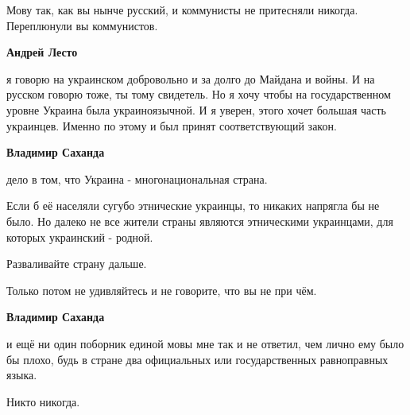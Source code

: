 \begin{itemize}
\begin{itemize}
Мову так, как вы нынче русский, и коммунисты не притесняли никогда. Переплюнули
вы коммунистов.

 
\textbf{Андрей Лесто} 

я говорю на украинском добровольно и за долго до Майдана и войны. И на русском
говорю тоже, ты тому свидетель. Но я хочу чтобы на государственном уровне
Украина была украиноязычной. И я уверен, этого хочет большая часть украинцев.
Именно по этому и был принят соответствующий закон.


 
\textbf{Владимир Саханда} 

дело в том, что Украина - многонациональная страна.

Если б её населяли сугубо этнические украинцы, то никаких напрягла бы не было.
Но далеко не все жители страны являются этническими украинцами, для которых
украинский - родной.

Разваливайте страну дальше.

Только потом не удивляйтесь и не говорите, что вы не при чём.

 
\textbf{Владимир Саханда} 

и ещё ни один поборник единой мовы мне так и не ответил, чем лично ему было бы
плохо, будь в стране два официальных или государственных равноправных языка.

Никто никогда.


 

\end{itemize}
\end{itemize}
